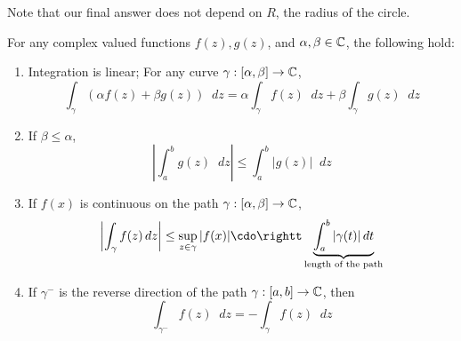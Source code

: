 \documentclass[11pt]{article}
\newcommand*\dif{\mathop{}\!d}
\begin{document}
Note that our final answer does not depend on $R$, the radius of the circle.
\begin{theorem}\label{theorem10}
	For any complex valued functions $f(z), g(z)$, and $\alpha, \beta \in \mathbb{C}$, the
	following hold:
	\begin{enumerate}
		\item Integration is linear; For any curve $\gamma:[\alpha,\beta] \to \mathbb{C}$,
			\begin{equation*} \int_{\gamma} (\alpha f(z)+\beta g(z))\dif z =
				\alpha\int_\gamma f(z)\dif z+\beta\int_\gamma g(z)\dif z
			\end{equation*}
		\item If $\beta \leq \alpha$,
			\begin{equation*}
				\left| \int_a^b g(z)\dif z\right| \leq \int_a^b |g(z)| \dif z
			\end{equation*}
		\item If $f(x)$ is continuous on the path $\gamma:[\alpha,\beta] \to \mathbb{C}$,
			\begin{equation*}
				\left| \int_\gamma f(z)\dif z\right| \leq \sup_{z \in \gamma}
				|f(x)| \cdo\rightt
				\underbrace{\int_a^b |\gamma(t)| \dif t}_{\text{length of the path}}
			\end{equation*}
		\item If $\gamma^-$ is the reverse direction of the path $\gamma:[a,b]\to\mathbb{C}$,
			then
			\begin{equation*}
				\int_{\gamma^-} f(z)\dif z = -\int_\gamma f(z)\dif z
			\end{equation*}
	\end{enumerate}
\end{theorem}
\end{document}
